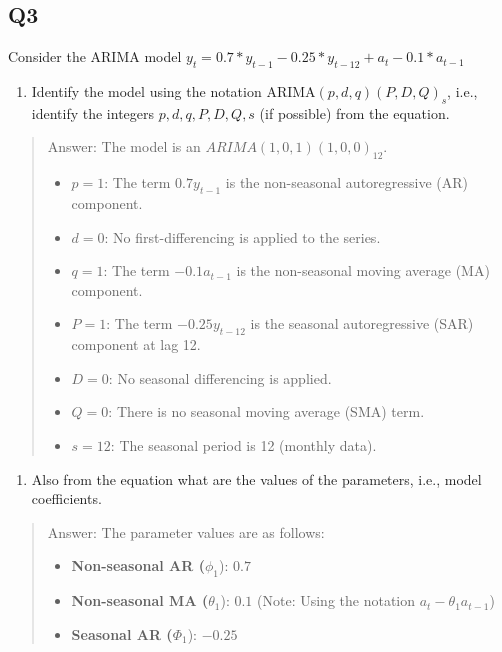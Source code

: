 \documentclass[
]{article}
\providecommand{\tightlist}{%
  \setlength{\itemsep}{0pt}\setlength{\parskip}{0pt}}
\begin{document}
\subsection{Q3}\label{q3}

Consider the ARIMA model
\(y_t=0.7*y_{t-1}-0.25*y_{t-12}+a_t-0.1*a_{t-1}\)

\begin{enumerate}
\def\labelenumi{(\alph{enumi})}
\tightlist
\item
  Identify the model using the notation ARIMA\((p,d,q)(P,D,Q)_ s\),
  i.e., identify the integers \(p,d,q,P,D,Q,s\) (if possible) from the
  equation.
\end{enumerate}

\begin{quote}
Answer: The model is an \(ARIMA(1,0,1)(1,0,0)_{12}\).

\begin{itemize}
\tightlist
\item
  \(p=1\): The term \(0.7 y_{t-1}\) is the non-seasonal autoregressive
  (AR) component.
\item
  \(d=0\): No first-differencing is applied to the series.
\item
  \(q=1\): The term \(-0.1 a_{t-1}\) is the non-seasonal moving average
  (MA) component.
\item
  \(P=1\): The term \(-0.25 y_{t-12}\) is the seasonal autoregressive
  (SAR) component at lag 12.
\item
  \(D=0\): No seasonal differencing is applied.
\item
  \(Q=0\): There is no seasonal moving average (SMA) term.
\item
  \(s=12\): The seasonal period is 12 (monthly data).
\end{itemize}
\end{quote}

\begin{enumerate}
\def\labelenumi{(\alph{enumi})}
\setcounter{enumi}{1}
\tightlist
\item
  Also from the equation what are the values of the parameters, i.e.,
  model coefficients.
\end{enumerate}

\begin{quote}
Answer: The parameter values are as follows:

\begin{itemize}
\tightlist
\item
  \textbf{Non-seasonal AR (}\(\phi_1\)): \(0.7\)
\item
  \textbf{Non-seasonal MA (}\(\theta_1\)): \(0.1\) (Note: Using the
  notation \(a_t - \theta_1 a_{t-1}\))
\item
  \textbf{Seasonal AR (}\(\Phi_1\)): \(-0.25\)
\end{itemize}
\end{quote}
\end{document}
